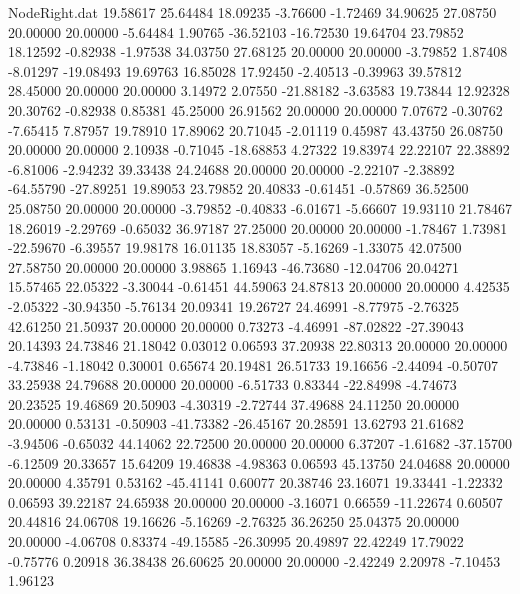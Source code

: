 \begin{filecontents}{NodeRight.dat}
  19.58617   25.64484   18.09235    -3.76600   -1.72469   34.90625   27.08750   20.00000   20.00000   -5.64484    1.90765  -36.52103  -16.72530
  19.64704   23.79852   18.12592    -0.82938   -1.97538   34.03750   27.68125   20.00000   20.00000   -3.79852    1.87408   -8.01297  -19.08493
  19.69763   16.85028   17.92450    -2.40513   -0.39963   39.57812   28.45000   20.00000   20.00000    3.14972    2.07550  -21.88182   -3.63583
  19.73844   12.92328   20.30762    -0.82938    0.85381   45.25000   26.91562   20.00000   20.00000    7.07672   -0.30762   -7.65415    7.87957
  19.78910   17.89062   20.71045    -2.01119    0.45987   43.43750   26.08750   20.00000   20.00000    2.10938   -0.71045  -18.68853    4.27322
  19.83974   22.22107   22.38892    -6.81006   -2.94232   39.33438   24.24688   20.00000   20.00000   -2.22107   -2.38892  -64.55790  -27.89251
  19.89053   23.79852   20.40833    -0.61451   -0.57869   36.52500   25.08750   20.00000   20.00000   -3.79852   -0.40833   -6.01671   -5.66607
  19.93110   21.78467   18.26019    -2.29769   -0.65032   36.97187   27.25000   20.00000   20.00000   -1.78467    1.73981  -22.59670   -6.39557
  19.98178   16.01135   18.83057    -5.16269   -1.33075   42.07500   27.58750   20.00000   20.00000    3.98865    1.16943  -46.73680  -12.04706
  20.04271   15.57465   22.05322    -3.30044   -0.61451   44.59063   24.87813   20.00000   20.00000    4.42535   -2.05322  -30.94350   -5.76134
  20.09341   19.26727   24.46991    -8.77975   -2.76325   42.61250   21.50937   20.00000   20.00000    0.73273   -4.46991  -87.02822  -27.39043
  20.14393   24.73846   21.18042     0.03012    0.06593   37.20938   22.80313   20.00000   20.00000   -4.73846   -1.18042    0.30001    0.65674
  20.19481   26.51733   19.16656    -2.44094   -0.50707   33.25938   24.79688   20.00000   20.00000   -6.51733    0.83344  -22.84998   -4.74673
  20.23525   19.46869   20.50903    -4.30319   -2.72744   37.49688   24.11250   20.00000   20.00000    0.53131   -0.50903  -41.73382  -26.45167
  20.28591   13.62793   21.61682    -3.94506   -0.65032   44.14062   22.72500   20.00000   20.00000    6.37207   -1.61682  -37.15700   -6.12509
  20.33657   15.64209   19.46838    -4.98363    0.06593   45.13750   24.04688   20.00000   20.00000    4.35791    0.53162  -45.41141    0.60077
  20.38746   23.16071   19.33441    -1.22332    0.06593   39.22187   24.65938   20.00000   20.00000   -3.16071    0.66559  -11.22674    0.60507
  20.44816   24.06708   19.16626    -5.16269   -2.76325   36.26250   25.04375   20.00000   20.00000   -4.06708    0.83374  -49.15585  -26.30995
  20.49897   22.42249   17.79022    -0.75776    0.20918   36.38438   26.60625   20.00000   20.00000   -2.42249    2.20978   -7.10453    1.96123

\end{filecontents}

